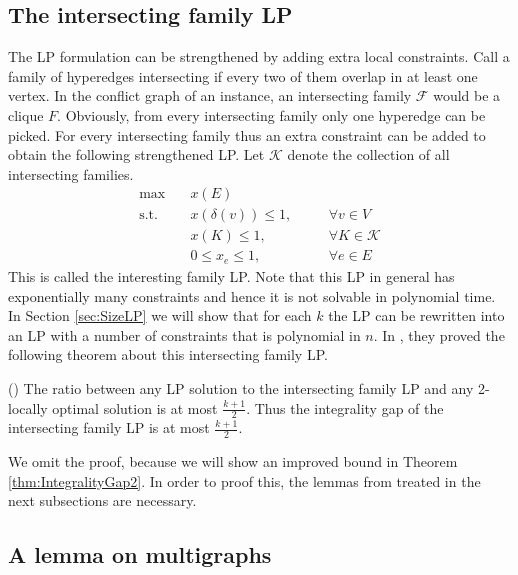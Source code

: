 \subsection{The intersecting family LP}\label{subsec:IntersectingFamilyLP}

The LP formulation can be strengthened by adding extra local constraints. Call a family of hyperedges intersecting if every two of them overlap in at least one vertex. In the conflict graph of an instance, an intersecting family $\mathcal{F}$ would be a clique $F$. Obviously, from every intersecting family only one hyperedge can be picked. For every intersecting family thus an extra constraint can be added to obtain the following strengthened LP. Let $\mathcal{K}$ denote the collection of all intersecting families.
%
\begin{equation}\tag{Intersecting family LP}
\begin{alignedat}{2}
\text{max}  \quad & x(E) \ \\
\text{s.t.} \quad & x\left(\delta(v)\right) \leq 1, & \quad & \forall v \in V \\
            \quad & x\left(K\right) \leq 1,         & \quad & \forall K \in \mathcal{K} \\
                  & 0 \leq x_e \leq 1,              & \quad & \forall e \in E
\end{alignedat}
\end{equation}
%
This is called the interesting family LP. Note that this LP in general has exponentially many constraints and hence it is not solvable in polynomial time. In Section \ref{sec:SizeLP} we will show that for each $k$ the LP can be rewritten into an LP with a number of constraints that is polynomial in $n$. In \cite{LapChiLau}, they proved the following theorem about this intersecting family LP.
%
\begin{theorem}\label{thm:LPk+1/2}
(\cite[Theorem 4.1]{LapChiLau}) The ratio between any LP solution to the intersecting family LP and any 2-locally optimal solution is at most $\frac{k+1}{2}$. Thus the integrality gap of the intersecting family LP is at most $\frac{k+1}{2}$.
\end{theorem}
%
We omit the proof, because we will show an improved bound in Theorem \ref{thm:IntegralityGap2}. In order to proof this, the lemmas from \cite{BermanMIS} treated in the next subsections are necessary.

\subsection{A lemma on multigraphs}\label{subsec:lemma1}

